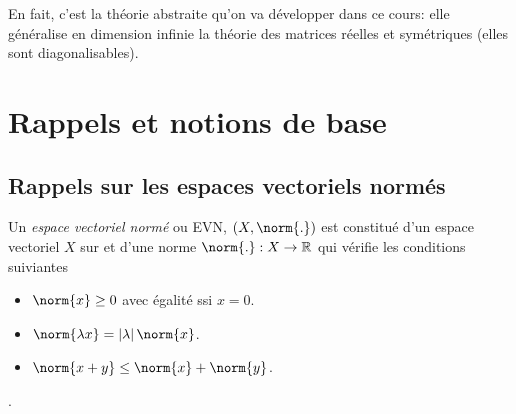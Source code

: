     En fait, c'est la théorie abstraite qu'on va développer dans ce cours:
    elle généralise en dimension infinie la théorie des matrices réelles et 
    symétriques (elles sont diagonalisables).

    \section{Rappels et notions de base}

    \subsection{Rappels sur les espaces vectoriels normés}

    \begin{definition}
        Un \emph{espace vectoriel normé} ou EVN, $(X, \norm{.})$ 
        est constitué d'un espace vectoriel $X$ sur \F et d'une norme 
        $\norm{.}: X \to \R$ qui vérifie les conditions suiviantes
        \begin{itemize}
            \item $\norm{x} \geq 0$ avec égalité ssi $x = 0$.
            \item $\norm{\lambda x} = \abs{\lambda} \norm{x}$.
            \item $\norm{x + y} \leq \norm{x} + \norm{y}$.
        \end{itemize}
    \end{definition}

    \newpage
    .

